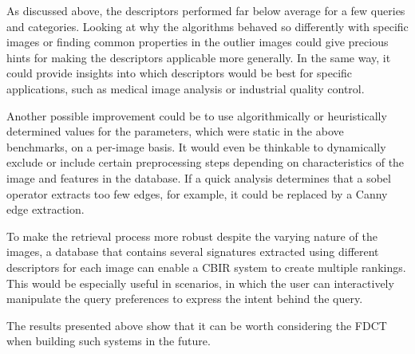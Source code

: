 As discussed above, the descriptors performed far below average for a few
queries and categories. Looking at why the algorithms behaved so differently
with specific images or finding common properties in the outlier images could
give precious hints for making the descriptors applicable more generally. In
the same way, it could provide insights into which descriptors would be best
for specific applications, such as medical image analysis or industrial quality
    control.

Another possible improvement could be to use algorithmically or heuristically
determined values for the parameters, which were static in the above
benchmarks, on a per-image basis. It would even be thinkable to dynamically
exclude or include certain preprocessing steps depending on characteristics of
the image and features in the database. If a quick analysis determines that a
sobel operator extracts too few edges, for example, it could be replaced by a
Canny edge extraction.

To make the retrieval process more robust despite the varying nature of the
images, a database that contains several signatures extracted using different
descriptors for each image can enable a CBIR system to create multiple
rankings. This would be especially useful in scenarios, in which the user can
interactively manipulate the query preferences to express the intent behind the
query.

The results presented above show that it can be worth considering the FDCT when
building such systems in the future.
